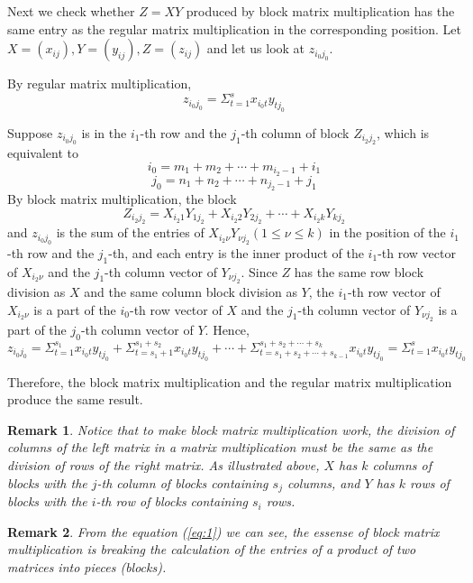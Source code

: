 \documentclass[onecolumn]{ctexart}
\newtheorem{remark}{Remark}
\begin{document}
Next we check whether $Z = XY$ produced by block matrix multiplication has the 
same entry as the regular matrix multiplication in the corresponding position. 
Let $X = (x_{ij}), Y = (y_{ij}), Z = (z_{ij})$ and let us look at $z_{i_0j_0}$.

By regular matrix multiplication,
\[
  z_{i_0j_0} = \Sigma_{t=1}^s x_{i_0 t} y_{t j_0}
\]

Suppose $z_{i_0j_0}$ is in the $i_1$-th row and the $j_1$-th column of block 
$Z_{i_2j_2}$, which is equivalent to
\[
  i_0 = m_1 + m_2 + \cdots + m_{i_2 - 1} + i_1
\]
\[
  j_0 = n_1 + n_2 + \cdots + n_{j_2 - 1} + j_1
\]
By block matrix multiplication, the block
\[
  Z_{i_2j_2} = X_{i_2 1}Y_{1 j_2} + X_{i_2 2}Y_{2 j_2} + \cdots + X_{i_2 k}Y_{k j_2}
\]
and $z_{i_0j_0}$ is the sum of the entries of $X_{i_2 \nu}Y_{\nu j_2} (1 \leq 
\nu \leq k)$ in the position of the $i_1$-th row and the $j_1$-th, and each 
entry is the inner product of the $i_1$-th row vector of $X_{i_2 \nu}$ and the 
$j_1$-th column vector of $Y_{\nu j_2}$. Since $Z$ has the same row block 
division as $X$ and the same column block division as $Y$, the $i_1$-th row 
vector of $X_{i_2 \nu}$ is a part of the $i_0$-th row vector of $X$ and the 
$j_1$-th column vector of $Y_{\nu j_2}$ is a part of the $j_0$-th column vector 
of $Y$. Hence,
\begin{equation} \label{eq:1}
  z_{i_0j_0} = \Sigma_{t=1}^{s_1} x_{i_0 t} y_{t j_0} + \Sigma_{t=s_1+1}^{s_1+s_2} x_{i_0 t} y_{t j_0} + \cdots + \Sigma_{t=s_1+s_2+\cdots+s_{k-1}}^{s_1+s_2+\cdots+s_k} x_{i_0 t} y_{t j_0} = \Sigma_{t=1}^{s} x_{i_0 t} y_{t j_0}
\end{equation}

Therefore, the block matrix multiplication and the regular matrix multiplication 
produce the same result.

\begin{remark}
  Notice that to make block matrix multiplication work, the division of columns 
  of the left matrix in a matrix multiplication must be the same as the division 
  of rows of the right matrix. As illustrated above, $X$ has $k$ columns of 
  blocks with the $j$-th column of blocks containing $s_j$ columns, and $Y$ has 
  $k$ rows of blocks with the $i$-th row of blocks containing $s_i$ rows.
\end{remark}

\begin{remark}
  From the equation (\ref{eq:1}) we can see, the essense of block matrix 
  multiplication is breaking the calculation of the entries of a product of two 
  matrices into pieces (blocks).
\end{remark}
\end{document}

